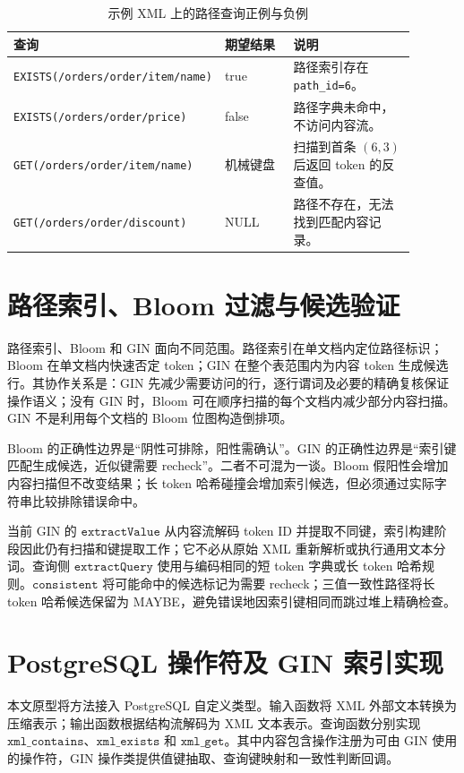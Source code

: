 \begin{table}[htbp]
\centering
\small
\caption{示例 XML 上的路径查询正例与负例}
\label{tab:query-example-path}
\begin{tabular}{p{0.39\linewidth}p{0.18\linewidth}p{0.32\linewidth}}
\toprule
查询 & 期望结果 & 说明 \\
\midrule
\texttt{EXISTS(/orders/order/item/name)} & true & 路径索引存在 \texttt{path\_id=6}。 \\
\texttt{EXISTS(/orders/order/price)} & false & 路径字典未命中，不访问内容流。 \\
\texttt{GET(/orders/order/item/name)} & 机械键盘 & 扫描到首条 $(6,3)$ 后返回 token 的反查值。 \\
\texttt{GET(/orders/order/discount)} & NULL & 路径不存在，无法找到匹配内容记录。 \\
\bottomrule
\end{tabular}
\end{table}

\section{路径索引、Bloom 过滤与候选验证}

路径索引、Bloom 和 GIN 面向不同范围。路径索引在单文档内定位路径标识；Bloom 在单文档内快速否定 token；GIN 在整个表范围内为内容 token 生成候选行。其协作关系是：GIN 先减少需要访问的行，逐行谓词及必要的精确复核保证操作语义；没有 GIN 时，Bloom 可在顺序扫描的每个文档内减少部分内容扫描。GIN 不是利用每个文档的 Bloom 位图构造倒排项。

Bloom 的正确性边界是“阴性可排除，阳性需确认”。GIN 的正确性边界是“索引键匹配生成候选，近似键需要 recheck”。二者不可混为一谈。Bloom 假阳性会增加内容扫描但不改变结果；长 token 哈希碰撞会增加索引候选，但必须通过实际字符串比较排除错误命中。

当前 GIN 的 $\texttt{extractValue}$ 从内容流解码 token ID 并提取不同键，索引构建阶段因此仍有扫描和键提取工作；它不必从原始 XML 重新解析或执行通用文本分词。查询侧 $\texttt{extractQuery}$ 使用与编码相同的短 token 字典或长 token 哈希规则。$\texttt{consistent}$ 将可能命中的候选标记为需要 recheck；三值一致性路径将长 token 哈希候选保留为 MAYBE，避免错误地因索引键相同而跳过堆上精确检查。

\section{PostgreSQL 操作符及 GIN 索引实现}

本文原型将方法接入 PostgreSQL 自定义类型。输入函数将 XML 外部文本转换为压缩表示；输出函数根据结构流解码为 XML 文本表示。查询函数分别实现 $\texttt{xml\_contains}$、$\texttt{xml\_exists}$ 和 $\texttt{xml\_get}$。其中内容包含操作注册为可由 GIN 使用的操作符，GIN 操作类提供值键抽取、查询键映射和一致性判断回调。

